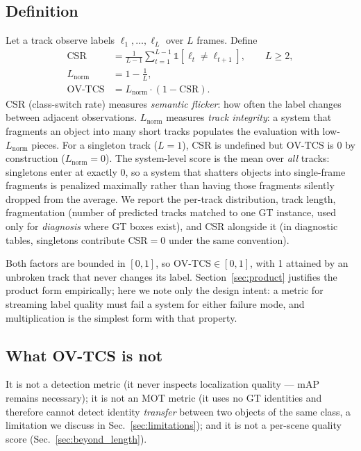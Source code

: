 \documentclass[10pt,twocolumn,letterpaper]{article}
\newcommand{\ovtcs}{\mathrm{OV\text{-}TCS}}
\newcommand{\csr}{\mathrm{CSR}}
\newcommand{\lnorm}{L_{\mathrm{norm}}}
\begin{document}
\subsection{Definition}
Let a track observe labels $\ell_1,\dots,\ell_L$ over $L$ frames. Define
\begin{align}
\csr &= \frac{1}{L-1}\sum_{t=1}^{L-1}\mathbb{1}[\ell_t \neq \ell_{t+1}],
\qquad L \ge 2,\\
\lnorm &= 1 - \tfrac{1}{L},\\
\ovtcs &= \lnorm\cdot(1-\csr).
\end{align}
$\csr$ (class-switch rate) measures \emph{semantic flicker}: how often the
label changes between adjacent observations. $\lnorm$ measures \emph{track
integrity}: a system that fragments an object into many short tracks
populates the evaluation with low-$\lnorm$ pieces. For a singleton track
($L{=}1$), $\csr$ is undefined but $\ovtcs$ is $0$ by construction
($\lnorm{=}0$). The system-level score is the mean over \emph{all} tracks:
singletons enter at exactly $0$, so a system that shatters objects into
single-frame fragments is penalized maximally rather than having those
fragments silently dropped from the average. We report the per-track
distribution, track length, fragmentation (number of predicted tracks matched
to one GT instance, used only for \emph{diagnosis} where GT boxes exist), and
$\csr$ alongside it (in diagnostic tables, singletons contribute $\csr{=}0$
under the same convention).

Both factors are bounded in $[0,1]$, so $\ovtcs\in[0,1]$, with 1 attained by
an unbroken track that never changes its label. Section~\ref{sec:product}
justifies the product form empirically; here we note only the design intent:
a metric for streaming label quality must fail a system for either failure
mode, and multiplication is the simplest form with that property.

\subsection{What OV-TCS is not}
It is not a detection metric (it never inspects localization quality --- mAP
remains necessary); it is not an MOT metric (it uses no GT identities and
therefore cannot detect identity \emph{transfer} between two objects of the
same class, a limitation we discuss in Sec.~\ref{sec:limitations}); and it is
not a per-scene quality score (Sec.~\ref{sec:beyond_length}).
\end{document}
